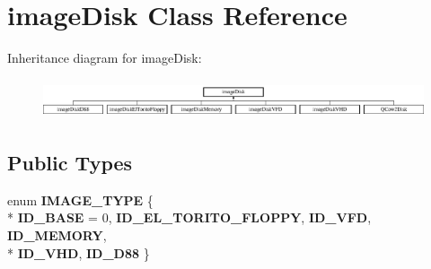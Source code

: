 \hypertarget{classimageDisk}{\section{image\-Disk Class Reference}
\label{classimageDisk}
}
Inheritance diagram for image\-Disk\-:\begin{figure}[H]
\begin{center}
\leavevmode
\includegraphics[height=1.174004cm]{classimageDisk}
\end{center}
\end{figure}
\subsection*{Public Types}
\begin{DoxyCompactItemize}
\item 
enum {\bfseries I\-M\-A\-G\-E\-\_\-\-T\-Y\-P\-E} \{ \\*
{\bfseries I\-D\-\_\-\-B\-A\-S\-E} = 0, 
{\bfseries I\-D\-\_\-\-E\-L\-\_\-\-T\-O\-R\-I\-T\-O\-\_\-\-F\-L\-O\-P\-P\-Y}, 
{\bfseries I\-D\-\_\-\-V\-F\-D}, 
{\bfseries I\-D\-\_\-\-M\-E\-M\-O\-R\-Y}, 
\\*
{\bfseries I\-D\-\_\-\-V\-H\-D}, 
{\bfseries I\-D\-\_\-\-D88}
 \}
\end{DoxyCompactItemize}
